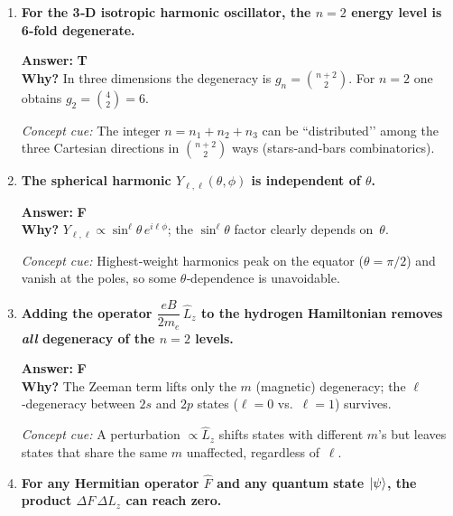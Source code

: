 \documentclass[12pt]{article}
\begin{document}
\begin{enumerate}[label=\textbf{\alph*)},itemsep=1.2\baselineskip]

\item \textbf{For the 3‑D isotropic harmonic oscillator, the $n=2$ energy level is 6‑fold
      degenerate.}

      \textbf{Answer:} \textbf{T}\\
      \textbf{Why?}  In three dimensions the degeneracy is
      $\displaystyle g_n=\binom{n+2}{2}$.  
      For $n=2$ one obtains $g_2=\binom{4}{2}=6$.\par
      \emph{Concept cue:}  The integer $n=n_1+n_2+n_3$ can be “distributed’’ among
      the three Cartesian directions in $\binom{n+2}{2}$ ways (stars‑and‑bars
      combinatorics).

\item \textbf{The spherical harmonic $Y_{\ell,\ell}(\theta,\phi)$ is independent of $\theta$.}

      \textbf{Answer:} \textbf{F}\\
      \textbf{Why?}  $Y_{\ell,\ell}\propto\sin^\ell\!\theta\,e^{i\ell\phi}$;
      the $\sin^\ell\!\theta$ factor clearly depends on~$\theta$.\par
      \emph{Concept cue:}  Highest‑weight harmonics peak on the equator
      ($\theta=\pi/2$) and vanish at the poles, so some $\theta$‑dependence is
      unavoidable.

\item \textbf{Adding the operator $\dfrac{eB}{2m_e}\,\hat L_z$ to the hydrogen Hamiltonian
      removes \emph{all} degeneracy of the $n=2$ levels.}

      \textbf{Answer:} \textbf{F}\\
      \textbf{Why?}  The Zeeman term lifts only the $m$ (magnetic) degeneracy; the
      $\ell$‑degeneracy between $2s$ and $2p$ states
      ($\ell=0$ vs.\ $\ell=1$) survives.\par
      \emph{Concept cue:}  A perturbation $\propto\hat L_z$ shifts states with
      different $m$’s but leaves states that share the same $m$ unaffected,
      regardless of~$\ell$.

\item \textbf{For any Hermitian operator $\hat F$ and any quantum state
      $\ket{\psi}$, the product $\Delta F\,\Delta L_z$ can reach zero.}


\end{enumerate}
\end{document}
